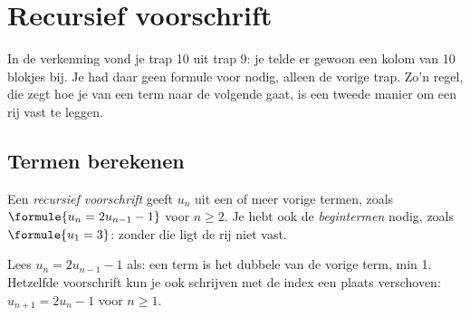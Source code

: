 
\begin{oefeningen}
\end{oefeningen}

\section{Recursief voorschrift}

In de verkenning vond je trap 10 uit trap 9: je telde er gewoon een kolom van 10 blokjes bij. Je had daar geen formule voor nodig, alleen de vorige trap. Zo'n regel, die zegt hoe je van een term naar de volgende gaat, is een tweede manier om een rij vast te leggen.

\subsection{Termen berekenen}

\begin{theorie}
Een \emph{recursief voorschrift} geeft $u_n$ uit een of meer vorige termen, zoals $\formule{u_n = 2u_{n-1} - 1}$ voor $n \geqslant 2$. Je hebt ook de \emph{begintermen} nodig, zoals $\formule{u_1 = 3}$: zonder die ligt de rij niet vast.
\end{theorie}

Lees $u_n = 2u_{n-1} - 1$ als: een term is het dubbele van de vorige term, min 1. Hetzelfde voorschrift kun je ook schrijven met de index een plaats verschoven: $u_{n+1} = 2u_n - 1$ voor $n \geqslant 1$.


